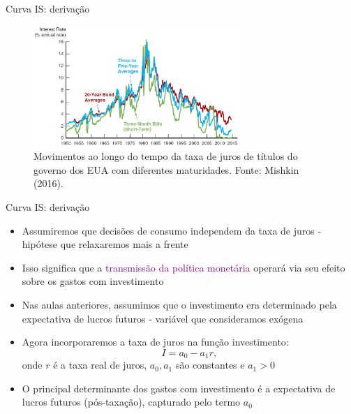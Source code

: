 \documentclass[10pt]{beamer}
\begin{document}
\begin{frame}{Curva IS: derivação}
    \begin{figure}
        \centering
        \includegraphics[width=0.7\textwidth]{./figures/aula6_fig5.PNG}
        \caption{Movimentos ao longo do tempo da taxa de juros de títulos do governo dos EUA com diferentes maturidades. Fonte: Mishkin (2016).}
        \label{aula6_fig5}
    \end{figure}
\end{frame}

\begin{frame}{Curva IS: derivação}
    \begin{itemize}
        \item Assumiremos que decisões de consumo independem da taxa de juros - hipótese que relaxaremos mais a frente\bigskip

        \item Isso significa que a \textcolor{purple}{transmissão da política monetária} operará via seu efeito sobre os gastos com investimento\bigskip

        \item Nas aulas anteriores, assumimos que o investimento era determinado pela expectativa de lucros futuros - variável que consideramos exógena\bigskip

        \item Agora incorporaremos a taxa de juros na função investimento:
        \begin{equation}
            I = a_0 - a_1 r,
            \label{aula6_eq2}
        \end{equation}
        onde $r$ é a taxa real de juros, $a_0, a_1$ são constantes e $a_1 > 0$\bigskip

        \item O principal determinante dos gastos com investimento é a expectativa de lucros futuros (pós-taxação), capturado pelo termo $a_0$
    \end{itemize}
\end{frame}
\end{document}
